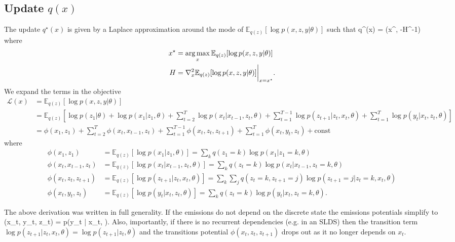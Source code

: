 \documentclass[11pt]{article}
\begin{document}
\subsection{Update $q(x)$}
The update $q^\star(x)$ is given by a Laplace approximation around the mode of $\mathbb{E}_{q(z)}[\log p(x, z, y | \theta)]$ such that 
\be
q^\star(x)  = (x^\star, -H^{-1}) 
\ee
where 
\begin{align*}
x^\star &= \operatorname*{arg\,max}_x \mathbb{E}_{q(z)}[\log p(x, z, y | \theta)] \\
H &= \nabla_x^2 \mathbb{E}_{q(z)}[\log p(x, z, y | \theta)] \bigg|_{x = x^\star}.
\end{align*}
We expand the terms in the objective
\begin{align*}
\mathcal{L}(x) &= \mathbb{E}_{q(z)}[\log p(x, z, y | \theta)] \\
& = \mathbb{E}_{q(z)} [ \log p(z_1 | \theta) +  \log p(x_1 | z_1, \theta) + \sum_{t=2}^{T} \log p(x_t | x_{t-1}, z_t, \theta) + \sum_{t=1}^{T-1} \log p(z_{t+1} | z_t, x_t, \theta) + \sum_{t=1}^T \log p(y_t | x_t, z_t, \theta)] \\
& = \phi(x_1, z_1) + \sum_{t=2}^T \phi(x_t, x_{t-1}, z_t) + \sum_{t=1}^{T-1} \phi(x_t, z_t, z_{t+1}) + \sum_{t=1}^T \phi(x_t, y_t, z_t) + \text{const} 
\end{align*}
where
\begin{align*}
\phi(x_1, z_1) & =  \mathbb{E}_{q(z)}[\log p(x_1 |  z_1 , \theta)] = \sum_k q(z_1 = k) \log p(x_1 | z_1 = k, \theta) \\
\phi(x_t, x_{t-1}, z_t) & = \mathbb{E}_{q(z)}[ \log p(x_t | x_{t-1}, z_t, \theta) ] = \sum_{k} q(z_t = k) \log p(x_t | x_{t-1}, z_t = k, \theta)  \\
\phi(x_t, z_t, z_{t+1}) & = \mathbb{E}_{q(z)}[  \log p(z_{t+1} | z_t, x_t, \theta) ] = \sum_k \sum_j q(z_t = k, z_{t+1} = j) \log p(z_{t+1} = j | z_t = k, x_t, \theta) \\  
\phi(x_t, y_t, z_t) & = \mathbb{E}_{q(z)}[  \log p(y_t | x_t, z_t, \theta) ] = \sum_k q(z_t = k) \log p(y_t | x_t , z_t = k, \theta) .
\end{align*}

The above derivation was written in full generality. If the emissions do not depend on the discrete state the emissions potentials simplify to 
\be
\phi(x_t, y_t, z_t) =  \log p(y_t | x_t, \theta).
\ee
Also, importantly, if there is no recurrent dependencies (e.g. in an SLDS) then the transition term  $\log p(z_{t+1} | z_t, x_t, \theta) = \log p(z_{t+1} | z_t, \theta)$ and the transitions potential $\phi(x_t, z_t, z_{t+1})$ drops out as it no longer depends on $x_t$. 
\end{document}
